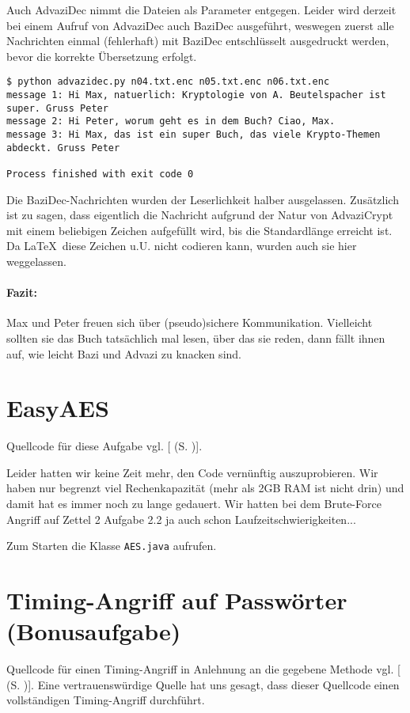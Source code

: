 \documentclass[twoside]{article}
\newcommand{\ttt}[1]{%
	\texttt{#1}%
}
\newcommand{\mref}[1]{[\nameref{#1} (S. \pageref{#1})]}
\begin{document}
		Auch AdvaziDec nimmt die Dateien als Parameter entgegen.
		Leider wird derzeit bei einem Aufruf von AdvaziDec auch BaziDec ausgeführt, weswegen zuerst alle Nachrichten einmal (fehlerhaft) mit BaziDec entschlüsselt ausgedruckt werden, bevor die korrekte Übersetzung erfolgt.
		\begin{verbatim}
$ python advazidec.py n04.txt.enc n05.txt.enc n06.txt.enc           
message 1: Hi Max, natuerlich: Kryptologie von A. Beutelspacher ist super. Gruss Peter
message 2: Hi Peter, worum geht es in dem Buch? Ciao, Max.
message 3: Hi Max, das ist ein super Buch, das viele Krypto-Themen abdeckt. Gruss Peter

Process finished with exit code 0
		\end{verbatim}
		Die BaziDec-Nachrichten wurden der Leserlichkeit halber ausgelassen.
		Zusätzlich ist zu sagen, dass eigentlich die Nachricht aufgrund der Natur von AdvaziCrypt mit einem beliebigen Zeichen aufgefüllt wird, bis die Standardlänge erreicht ist.
		Da \LaTeX ~diese Zeichen u.U. nicht codieren kann, wurden auch sie hier weggelassen.
		
		\paragraph{Fazit:} Max und Peter freuen sich über (pseudo)sichere Kommunikation.
		Vielleicht sollten sie das Buch tatsächlich mal lesen, über das sie reden, dann fällt ihnen auf, wie leicht Bazi und Advazi zu knacken sind.
\section{EasyAES}
	\label{sec:easyaes}
	Quellcode für diese Aufgabe vgl. \mref{AES}.
	
	Leider hatten wir keine Zeit mehr, den Code vernünftig auszuprobieren.
	Wir haben nur begrenzt viel Rechenkapazität (mehr als 2GB RAM ist nicht drin) und damit hat es immer noch zu lange gedauert.
	Wir hatten bei dem Brute-Force Angriff auf Zettel 2 Aufgabe 2.2 ja auch schon Laufzeitschwierigkeiten...
	
	Zum Starten die Klasse \ttt{AES.java} aufrufen.
\section{Timing-Angriff auf Passwörter (Bonusaufgabe)}
	\label{sec:timing}
		Quellcode für einen Timing-Angriff in Anlehnung an die gegebene Methode vgl. \mref{timing}.
		Eine vertrauenswürdige Quelle hat uns gesagt, dass dieser Quellcode einen vollständigen Timing-Angriff durchführt.
\end{document}
